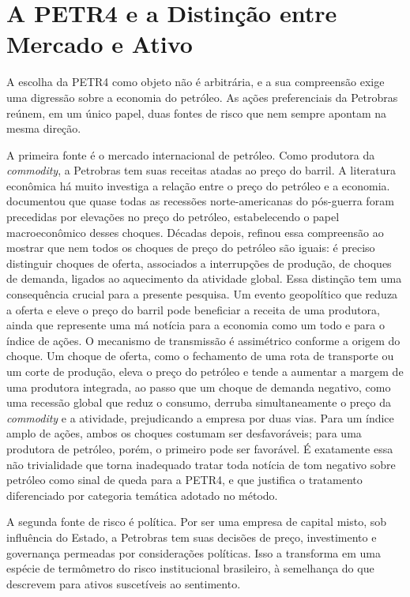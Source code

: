 \section{A PETR4 e a Distinção entre Mercado e Ativo}

A escolha da PETR4 como objeto não é arbitrária, e a sua compreensão exige uma digressão sobre a economia do petróleo. As ações preferenciais da Petrobras reúnem, em um único papel, duas fontes de risco que nem sempre apontam na mesma direção.

A primeira fonte é o mercado internacional de petróleo. Como produtora da \textit{commodity}, a Petrobras tem suas receitas atadas ao preço do barril. A literatura econômica há muito investiga a relação entre o preço do petróleo e a economia.  documentou que quase todas as recessões norte-americanas do pós-guerra foram precedidas por elevações no preço do petróleo, estabelecendo o papel macroeconômico desses choques. Décadas depois,  refinou essa compreensão ao mostrar que nem todos os choques de preço do petróleo são iguais: é preciso distinguir choques de oferta, associados a interrupções de produção, de choques de demanda, ligados ao aquecimento da atividade global. Essa distinção tem uma consequência crucial para a presente pesquisa. Um evento geopolítico que reduza a oferta e eleve o preço do barril pode beneficiar a receita de uma produtora, ainda que represente uma má notícia para a economia como um todo e para o índice de ações. O mecanismo de transmissão é assimétrico conforme a origem do choque. Um choque de oferta, como o fechamento de uma rota de transporte ou um corte de produção, eleva o preço do petróleo e tende a aumentar a margem de uma produtora integrada, ao passo que um choque de demanda negativo, como uma recessão global que reduz o consumo, derruba simultaneamente o preço da \textit{commodity} e a atividade, prejudicando a empresa por duas vias. Para um índice amplo de ações, ambos os choques costumam ser desfavoráveis; para uma produtora de petróleo, porém, o primeiro pode ser favorável. É exatamente essa não trivialidade que torna inadequado tratar toda notícia de tom negativo sobre petróleo como sinal de queda para a PETR4, e que justifica o tratamento diferenciado por categoria temática adotado no método.

A segunda fonte de risco é política. Por ser uma empresa de capital misto, sob influência do Estado, a Petrobras tem suas decisões de preço, investimento e governança permeadas por considerações políticas. Isso a transforma em uma espécie de termômetro do risco institucional brasileiro, à semelhança do que  descrevem para ativos suscetíveis ao sentimento.

